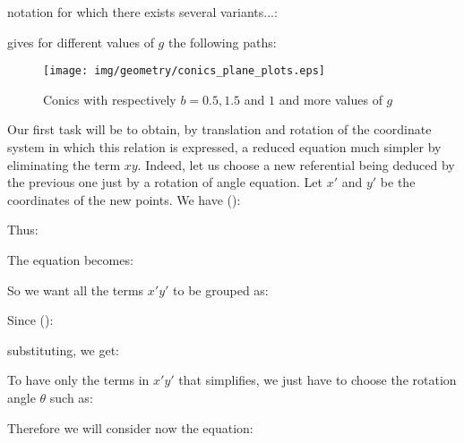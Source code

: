 notation for which there exists several variants...:
	

	gives for different values of $g$ the following paths:
	\begin{figure}[H]
		\centering
		\texttt{[image: img/geometry/conics\_plane\_plots.eps]}
		\caption{Conics with respectively $b=0.5, 1.5$ and $1$ and more values of $g$}
	\end{figure}
	Our first task will be to obtain, by translation and rotation of the coordinate system in which this relation is expressed, a reduced equation much simpler by eliminating the term $xy$. Indeed, let us choose a new referential being deduced by the previous one just by a rotation of angle equation. Let $x'$ and $y'$ be the coordinates of the new points. We have ():
	
Thus:
	
The equation becomes:
	
So we want all the terms $x'y'$ to be grouped as:
	
Since ():
	
substituting, we get:
	
To have only the terms in $x'y'$ that simplifies, we just have to choose the rotation angle $\theta$ such as:
	
Therefore we will consider now the equation:
	
